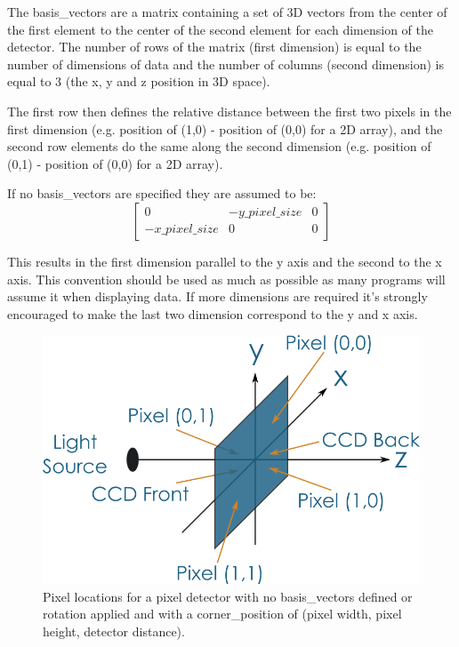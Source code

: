 \documentclass[usletter,11pt]{article}
\begin{document}
The basis\_vectors are a matrix containing a set of 3D vectors from the
center of the first element to the center of the second element
for each dimension of the detector. The number of rows of the matrix
(first dimension) is equal to the number of dimensions of data and the
number of columns (second dimension) is equal to 3 (the x, y and z position in 3D space).

The first row then defines the relative distance between the first two
pixels in the first dimension (e.g. position of (1,0) - position of
(0,0) for a 2D array),
and the second row elements do the same along the second dimension (e.g. position of
(0,1) - position of (0,0) for a 2D array).

If no basis\_vectors are specified they are assumed to be:
\[
 \begin{bmatrix}
  0 & -y\_pixel\_size & 0 \\
  -x\_pixel\_size & 0 & 0 
\end{bmatrix}
\]

This results in the first dimension parallel to the y axis and the second to the x
axis. This convention should be used as much as possible as many
programs will assume it when displaying data. If more dimensions are
required it's strongly encouraged to make the last two dimension
correspond to the y and x axis.

\begin{figure}[h!]
\centering
\includegraphics[width=\textwidth]{detector_coord_system.png}
\caption{Pixel locations for a pixel detector with no basis\_vectors
  defined or rotation applied and with a corner\_position of (pixel
  width, pixel height, detector distance).}
\label{fig:detector_coord_system}
\end{figure}
\end{document}
